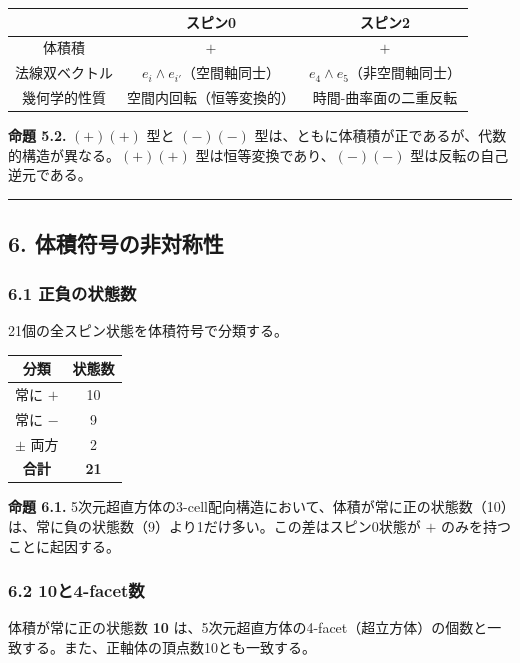 \documentclass[a4paper,11pt]{ltjsarticle}
\newcounter{none}
\begin{document}
{\def\LTcaptype{none}
\begin{longtable}[]{@{}ccc@{}}
\toprule
& スピン0 & スピン2 \\
\midrule
\endhead
\bottomrule
\endlastfoot
体積積 & $+$ & $+$ \\
法線双ベクトル & $e_i \wedge e_{i'}$（空間軸同士） & $e_4 \wedge e_5$（非空間軸同士） \\
幾何学的性質 & 空間内回転（恒等変換的） & 時間-曲率面の二重反転 \\
\end{longtable}
}

\textbf{命題 5.2.} $(+)(+)$ 型と $(-)(-)$ 型は、ともに体積積が正であるが、代数的構造が異なる。$(+)(+)$ 型は恒等変換であり、$(-)(-)$ 型は反転の自己逆元である。

\begin{center}\rule{0.5\linewidth}{0.5pt}\end{center}

\subsection*{6. 体積符号の非対称性}

\subsubsection*{6.1 正負の状態数}

21個の全スピン状態を体積符号で分類する。

{\def\LTcaptype{none}
\begin{longtable}[]{@{}cc@{}}
\toprule
分類 & 状態数 \\
\midrule
\endhead
\bottomrule
\endlastfoot
常に $+$ & 10 \\
常に $-$ & 9 \\
$\pm$ 両方 & 2 \\
\textbf{合計} & \textbf{21} \\
\end{longtable}
}

\textbf{命題 6.1.} 5次元超直方体の3-cell配向構造において、体積が常に正の状態数（10）は、常に負の状態数（9）より1だけ多い。この差はスピン0状態が $+$ のみを持つことに起因する。

\subsubsection*{6.2 10と4-facet数}

体積が常に正の状態数 \textbf{10} は、5次元超直方体の4-facet（超立方体）の個数と一致する。また、正軸体の頂点数10とも一致する。
\end{document}
